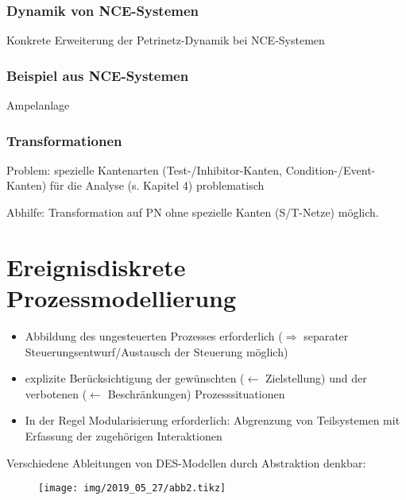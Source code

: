 \subsubsection{Dynamik von NCE-Systemen}
Konkrete Erweiterung der Petrinetz-Dynamik bei NCE-Systemen 

\subsubsection{Beispiel aus NCE-Systemen}
Ampelanlage 


\subsubsection{Transformationen}

\begin{descFixed}[2]
	\item[Problem:] spezielle Kantenarten (Test-/Inhibitor-Kanten, Condition-/Event-Kanten) für die Analyse (s. Kapitel 4) problematisch
	\item[Abhilfe:] Transformation auf PN ohne spezielle Kanten (S/T-Netze) möglich. 
\end{descFixed}



\section{Ereignisdiskrete Prozessmodellierung}
\begin{itemize}
	\item Abbildung des ungesteuerten Prozesses erforderlich ($\Rightarrow$ separater Steuerungsentwurf/Austausch der Steuerung möglich)
	\item explizite Berücksichtigung der gewünschten ($\leftarrow$ Zielstellung) und der verbotenen ($\leftarrow$ Beschränkungen) Prozesssituationen
	\item In der Regel Modularisierung erforderlich: Abgrenzung von Teilsystemen mit Erfassung der zugehörigen Interaktionen
\end{itemize}

Verschiedene Ableitungen von DES-Modellen durch Abstraktion denkbar:

\begin{figure}[H]
	\centering
	\texttt{[image: img/2019\_05\_27/abb2.tikz]}
\end{figure}

